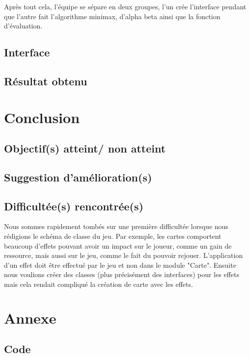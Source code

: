 \documentclass[a4paper, 12pt, french]{article}
\begin{document}
	Après tout cela, l'équipe se sépare en deux groupes, l'un crée l'interface pendant que l'autre fait
	l'algorithme minimax, d'alpha beta ainsi que la fonction d'évaluation.


	\subsection{Interface}
	\subsection{Résultat obtenu}

	\section{Conclusion}
	\subsection{Objectif(s) atteint/ non atteint}
	\subsection{Suggestion d'amélioration(s)}
	\subsection{Difficultée(s) rencontrée(s)}
	Nous sommes rapidement tombés sur une première difficultée lorsque nous rédigions le schéma de classe du jeu.
	Par exemple, les cartes comportent beaucoup d'effets pouvant avoir un impact sur le joueur,
	comme un gain de ressource, mais aussi sur le jeu, comme le fait du pouvoir rejouer. L'application d'un effet
	doit être effectué par le jeu et non dans le module "Carte". Ensuite nous voulions créer des classes (plus
	précisément des interfaces) pour les effets mais cela rendait compliqué la création de carte avec les effets.

	\section{Annexe}
	\subsection{Code}

	\printbibliography
\end{document}
